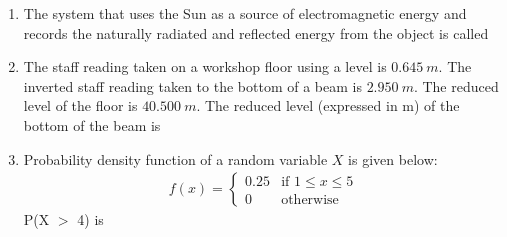 \documentclass[journal]{IEEEtran}
\begin{document}
\begin{enumerate}[resume]
\item The system that uses the Sun as a source of electromagnetic energy and records the naturally radiated and reflected energy from the object is called \hfill {}
\begin{enumerate}
\end{enumerate}

\item The staff reading taken on a workshop floor using a level is $0.645 \ m$. The inverted staff reading taken to the bottom of a beam is $2.950 \ m$. The reduced level of the floor is $40.500 \ m$. The reduced level (expressed in m) of the bottom of the beam is \hfill {}
\begin{enumerate}
\end{enumerate}

\item Probability density function of a random variable $X$ is given below:
\begin{align}
f(x) = \begin{cases}
0.25 & \text{if } 1 \leq x \leq 5 \\
0 & \text{otherwise}
\end{cases}
\end{align}
P(X $>$ 4) is \hfill {}
\begin{enumerate}
\end{enumerate}


\end{enumerate}
\end{document}
